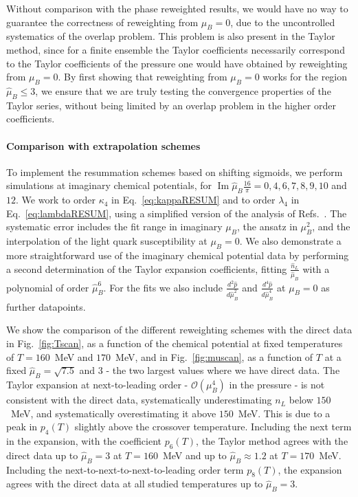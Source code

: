 \documentclass[twocolumn,showpacs,preprintnumbers,amsmath,amssymb,latexsym,prl,footinbib,floatfix,superscriptaddress]{revtex4-2}
\newcommand{\f}[2]{\frac{#1}{#2}}
\begin{document}
Without comparison with the phase reweighted results, we 
would have no way to guarantee the 
correctness of reweighting from $\mu_B=0$, due to the uncontrolled
systematics of the overlap problem. This 
problem is also present 
in the Taylor method, since for a finite ensemble the Taylor coefficients
necessarily correspond to the Taylor coefficients of the pressure one would have obtained 
by reweighting from $\mu_B=0$. By first 
showing that reweighting from $\mu_B=0$ works for 
the region $\hat{\mu}_B \leq 3$, we ensure 
that we are truly testing the convergence properties 
of the Taylor series, without being limited by an overlap problem 
in the higher order coefficients.

\paragraph{Comparison with extrapolation schemes}
To implement the resummation
schemes based on shifting sigmoids, we perform simulations
at imaginary 
chemical potentials, for $\operatorname{Im} \hat{\mu}_B \f{16}{\pi}= 0,4,6,7,8,9,10$ and $12$.
We work to order $\kappa_4$ in Eq.~\eqref{eq:kappaRESUM} and to order $\lambda_4$ in Eq.~\eqref{eq:lambdaRESUM}, 
using a simplified version of the analysis 
of Refs.~\cite{Borsanyi:2021sxv,Borsanyi:2022qlh}.
The systematic error includes the fit range in imaginary $\mu_B$, the ansatz in $\mu_B^2$, and the interpolation of the
light quark susceptibility at $\mu_B=0$.
We also demonstrate a more straightforward use of the imaginary chemical potential data by performing a second determination of the Taylor expansion coefficients, fitting
$\f{\hat{n}_L}{\hat{\mu}_B}$ with a polynomial of order $\hat{\mu}_B^6$.
For the fits 
we also include $\f{d^2 \hat{p}}{d \hat{\mu}_B^2}$ 
and $\f{d^4 \hat{p}}{d \hat{\mu}_B^4}$ at $\mu_B=0$ as further datapoints.


We show the comparison of the different reweighting 
schemes with the direct data in Fig.~\ref{fig:Tscan}, as 
a function of the chemical potential at fixed temperatures 
of $T=160$~MeV and $170$~MeV, 
and in Fig.~\ref{fig:muscan}, as 
a function of $T$ at a fixed 
$\hat{\mu}_B = \sqrt{7.5}$ 
and $3$ - the two largest  
values where we have direct data. 
The Taylor expansion at 
next-to-leading order - $\mathcal{O}(\mu_B^4)$ in the pressure - is 
not consistent with the direct data, systematically 
underestimating $n_L$ below $150$~MeV, and systematically overestimating 
it above $150$~MeV.
This is due to a peak in $p_4(T)$ slightly above the crossover temperature. 
Including the next term in the expansion, with 
the coefficient $p_6(T)$, the Taylor method agrees with the direct 
data up to $\hat{\mu}_B=3$ at $T=160$~MeV and up to $\hat{\mu}_B \approx 1.2$ at 
$T=170$~MeV. Including the next-to-next-to-next-to-leading order term $p_8(T)$, 
the expansion agrees with the direct data at all studied 
temperatures up to $\hat{\mu}_B = 3$.  
\end{document}
